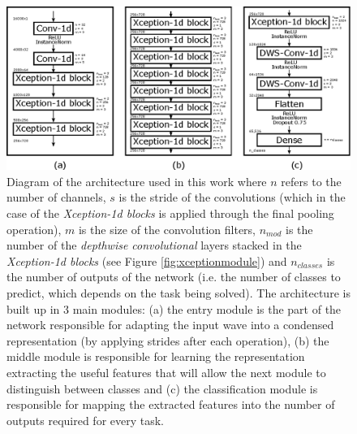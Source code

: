\begin{figure}[ht]
	\centering
	\includegraphics[width=1.0\linewidth]{kws/images/arch.eps}
	\caption[\textit{Xception-1d} architecture]{Diagram of the architecture used in this work where $n$ refers to the number of channels, $s$ is the stride of the convolutions (which in the case of the \textit{Xception-1d blocks} is applied through the final pooling operation), $m$ is the size of the convolution filters, $n_{mod}$ is the number of the \textit{depthwise convolutional} layers stacked in the \textit{Xception-1d blocks} (see Figure \ref{fig:xceptionmodule}) and $n_{classes}$ is the number of outputs of the network (i.e. the number of classes to predict, which depends on the task being solved). The architecture is built up in 3 main modules: (a) the entry module is the part of the network responsible for adapting the input wave into a condensed representation (by applying strides after each operation), (b) the middle module is responsible for learning the representation extracting the useful features that will allow the next module to distinguish between classes and (c) the classification module is responsible for mapping the extracted features into the number of outputs required for every task.}
	\label{fig:arch}
\end{figure}



